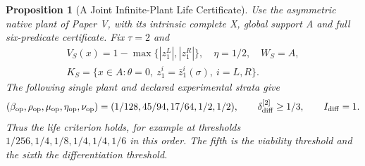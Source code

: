 \documentclass[11pt,a4paper]{article}
\newtheorem{proposition}{Proposition}[section]
\theoremstyle{definition}
\newcommand{\Idiff}{I_{\mathrm{diff}}}
\newcommand{\Bound}{\beta_{\mathrm{op}}}
\newcommand{\Persist}{\rho_{\mathrm{op}}}
\newcommand{\Maint}{\mu_{\mathrm{op}}}
\newcommand{\HistDep}{\eta_{\mathrm{op}}}
\newcommand{\Viab}{\nu_{\mathrm{op}}}
\begin{document}
\begin{proposition}[A Joint Infinite-Plant Life Certificate]
\label{prop:asymmetric-native-life}
Use the asymmetric native plant of Paper V, with its intrinsic complete X,
global support A and full six-predicate certificate. Fix $\tau=2$ and
\[
 \begin{gathered}
 V_S(x)=1-\max\{|z_1^L|,|z_1^R|\},\quad \eta=1/2,\quad W_S=A,
 \\
 K_S=\{x\in A:\theta=0,\ z_1^i=\bar z_1^i(\sigma),\ i=L,R\}.
 \end{gathered}
\]
The following single plant and declared experimental strata give
\[
 (\Bound,\Persist,\Maint,\HistDep,\Viab)
   =(1/128,45/94,17/64,1/2,1/2),
 \qquad \delta_{\rm diff}^{[2]}\ge1/3,
 \qquad \Idiff=1.
\]
Thus the life criterion holds, for example at thresholds
$1/256,1/4,1/8,1/4,1/4,1/6$ in this order. The fifth is the viability
threshold and the sixth the differentiation threshold.
\end{proposition}
\end{document}
